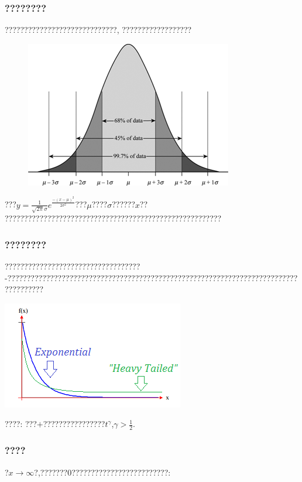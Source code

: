 \documentclass[cjk]{beamer}
\begin{document}
\begin{CJK*}{GBK}{song}
\begin{frame}
\end{frame}


\begin{frame}

\frametitle{????????}
\qquad ?????????????????????????????{\color{red}{????}}, ??????????????????

\begin{figure}
\centering\includegraphics[scale=0.35]{image/normal_distribution.png}
\end{figure}

???$y= \frac{1}{\sqrt{2\pi}\sigma}e^{\frac{-\left ( x-\mu  \right )^{2}}{2\sigma ^{2}}}$???$\mu$????$\sigma$??????$x$??
????????????????????????????????????????????????????????

\end{frame}

\begin{frame}

\frametitle{????????}
\qquad ???????????????????????????????????-?????????????????????????????????????????????????????????????????????????????????????

\centering\includegraphics[scale=0.5]{image/heavy_tailed.png}

????: ???$+$????????????????$t^{\gamma}$,$\gamma>\frac{1}{2}$.
\end{frame}
\begin{frame}
\frametitle{????}
?$x\rightarrow \infty$?,???????$0$?????????????????????????:


\end{frame}
\end{CJK*}
\end{document}
